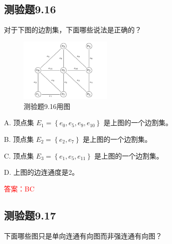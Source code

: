 \documentclass[UTF8, heading=true]{ctexart}
\begin{document}
\subsection{测验题9.16}

对于下图的边割集，下面哪些说法是正确的？

\begin{figure}[H]
    \centering
    \includegraphics[width=0.4\textwidth]{9.16.jpg} %
    \caption{测验题9.16用图}
\end{figure}

A. 顶点集 $E_1=\left\{e_0, e_5, e_9, e_{10}\right\}$ 是上图的一个边割集。

B. 顶点集 $E_2=\left\{e_2, e_7\right\}$ 是上图的一个边割集。

C. 顶点集 $E_3=\left\{e_1, e_5, e_{11}\right\}$ 是上图的一个边割集。

D. 上图的边连通度是2。

\textcolor{red}{答案：BC}

\subsection{测验题9.17}

下面哪些图只是单向连通有向图而非强连通有向图？
\end{document}
